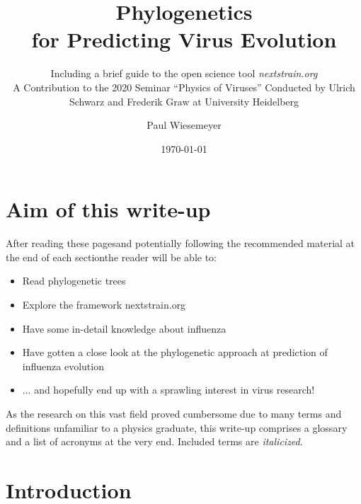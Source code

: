 \documentclass[12pt]{scrartcl}
\author{Paul Wiesemeyer}
\title{Phylogenetics\texorpdfstring{\\}{,} for Predicting Virus Evolution}
\subtitle{Including a brief guide to the open science tool {\LARGE\textit{nextstrain.org}} \texorpdfstring{\\[1cm]}{,}A Contribution to the 2020 Seminar ``Physics of Viruses'' Conducted by Ulrich Schwarz and Frederik Graw at University Heidelberg }
\date{\today}
\begin{document}
\maketitle

\clearpage

\section*{Aim of this write-up}

  After reading these pages\textemdash and potentially following the recommended material at the end of each section\textemdash the reader will be able to:
  \begin{itemize}
    \item Read phylogenetic trees
    \item Explore the framework nextstrain.org
    \item Have some in-detail knowledge about influenza
    \item Have gotten a close look at the phylogenetic approach at prediction of influenza evolution
    \item ... and hopefully end up with a sprawling interest in virus research!
  \end{itemize}

  As the research on this vast field proved cumbersome due to many terms and definitions unfamiliar to a physics graduate, this write-up comprises a glossary and a list of acronyms at the very end. Included terms are \textit{italicized}.

\vfill

\tableofcontents

\clearpage

\section{Introduction}
\end{document}
